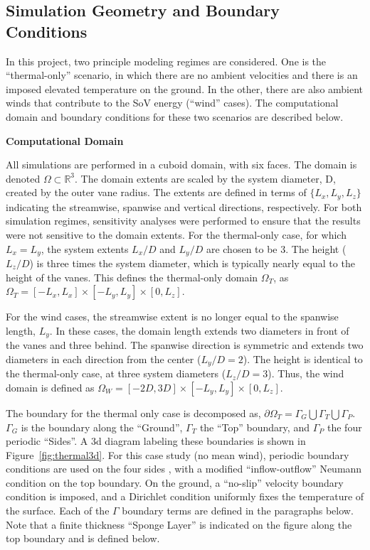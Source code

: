 \subsection{Simulation Geometry and Boundary Conditions}
\label{sec:bc}

In this project, two principle modeling regimes are considered. 
One is the ``thermal-only'' scenario, in which there are no ambient
velocities and there is an imposed elevated temperature on the ground.  
In the other, there are also ambient winds that contribute to the SoV energy
(``wind'' cases). 
The computational domain and boundary conditions for these 
two scenarios are described below.

\textbf{Computational Domain} 

All simulations are performed in a cuboid domain, with six
faces.  The domain is denoted $\Omega \subset \mathbb{R}^3$. 
The domain extents are scaled by the system diameter, D, created by the
outer vane radius. The extents are defined in terms of $\{L_x,L_y,L_z\}$ indicating the 
streamwise, spanwise and vertical directions, respectively. 
For both simulation regimes, sensitivity analyses 
were performed to ensure that the results were not sensitive 
to the domain extents. For the thermal-only case, for which $L_x = L_y$,
the system 
extents $L_x/D$ and $L_y/D$ are chosen to be 3. The height ($L_z/D$) is
three times the system diameter, which is typically nearly equal to the
height of the vanes. This defines the thermal-only domain $\Omega_T$, 
as $\Omega_T = \left[-L_x,L_x \right] \times \left[-L_y,L_y \right]
\times \left[0,L_z \right]$.   

For the wind cases, the streamwise extent is no longer equal to
the spanwise length, $L_y$. In these cases, the domain length extends
two diameters in front of the vanes and three behind. The
spanwise direction is symmetric and extends two diameters in each direction 
from the center ($L_y/D = 2$). The height is identical to the
thermal-only case, at three system diameters ($L_z/D = 3$). Thus, the
wind domain is defined as $\Omega_W = \left[-2D,3D \right] \times
\left[-L_y,L_y \right] \times \left[0,L_z \right]$.   

The boundary for the thermal only case is decomposed as,
$\partial \Omega_T = \Gamma_G \bigcup \Gamma_T \bigcup \Gamma_P $. 
$\Gamma_G$ is the boundary along the ``Ground'', $\Gamma_T$
the ``Top'' boundary, and $\Gamma_P$ the four periodic ``Sides''. A 3d
diagram labeling these boundaries is shown in
Figure~\ref{fig:thermal3d}. For this case study (no mean wind),
periodic boundary conditions are used on the four sides , with a modified 
``inflow-outflow'' Neumann condition\cite{gunzburger1989finite} on the
top boundary. On the ground, a ``no-slip'' velocity boundary condition is
imposed, and a Dirichlet condition uniformly fixes
the temperature of the surface. 
Each of the $\Gamma$ boundary terms are defined in the paragraphs below. 
Note that a finite thickness ``Sponge Layer'' is
indicated on the figure along the top boundary and is defined below. 

